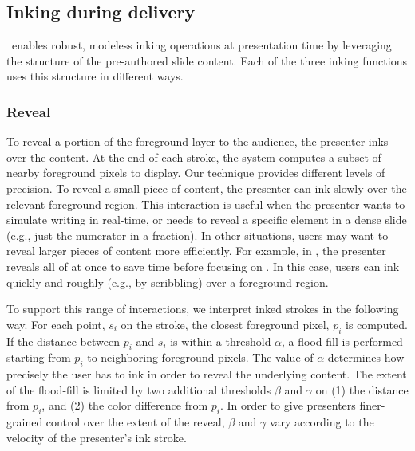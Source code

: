 \subsection{Inking during delivery}
%
\interface\ enables robust, modeless inking operations at presentation time by leveraging the structure of the pre-authored slide content. Each of the three inking functions uses this structure in different ways. 

\subsubsection{Reveal}
To reveal a portion of the foreground layer to the audience, the presenter inks over the content. At the end of each stroke, the system computes a subset of nearby foreground pixels to display. Our technique provides different levels of precision. To reveal a small piece of content, the presenter can ink slowly over the relevant foreground region. This interaction is useful when the presenter wants to simulate writing in real-time, or needs to reveal a specific element in a dense slide (e.g., just the numerator in a fraction). 
%
In other situations, users may want to reveal larger pieces of content more efficiently. For example, in , the presenter reveals all of  at once to save time before focusing on . In this case, users can ink quickly and roughly (e.g., by scribbling) over a foreground region.

To support this range of interactions, we interpret inked strokes in the following way.
%
For each point, $s_i$ on the stroke, the closest foreground pixel, $p_i$ is computed. If the distance between $p_i$ and $s_i$ is within a threshold $\alpha$, a flood-fill is performed starting from $p_i$ to neighboring foreground pixels. The value of $\alpha$ determines how precisely the user has to ink in order to reveal the underlying content. 
%
The extent of the flood-fill is limited by two additional thresholds $\beta$ and $\gamma$ on (1) the distance from $p_i$, and (2) the color difference from $p_i$. In order to give presenters finer-grained control over the extent of the reveal, $\beta$ and $\gamma$ vary according to the velocity of the presenter's ink stroke.  

